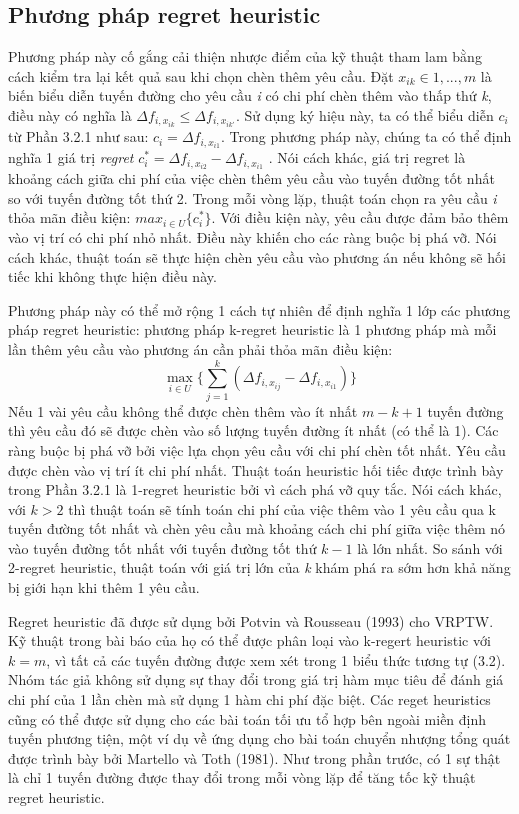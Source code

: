 \subsection{Phương pháp regret heuristic}
Phương pháp này cố gắng cải thiện nhược điểm của kỹ thuật tham lam bằng cách kiểm tra lại kết quả sau khi chọn chèn thêm yêu cầu. Đặt $x_{ik} \in {1, ..., m}$ là biến biểu diễn tuyến đường cho yêu cầu \textit{i} có chi phí chèn thêm vào thấp thứ \textit{k}, điều này có nghĩa là $\Delta f_{i, x_{ik}} \leqslant \Delta f_{i, x_{ik'}}$. Sử dụng ký hiệu này, ta có thể biểu diễn $c_i$ từ Phần 3.2.1 như sau: $c_i = \Delta f_{i, x_{i1}}$. Trong phương pháp này, chúng ta có thể định nghĩa 1 giá trị \textit{regret} $c_i^* = \Delta f_{i, x_{i2}} - \Delta f_{i, x_{i1}}$ . Nói cách khác, giá trị regret là khoảng cách giữa chi phí của việc chèn thêm yêu cầu vào tuyến đường tốt nhất so với tuyến đường tốt thứ 2. Trong mỗi vòng lặp, thuật toán chọn ra yêu cầu \textit{i} thỏa mãn điều kiện: $max_{i \in U} \{c_i^*\}$. Với điều kiện này, yêu cầu được đảm bảo thêm vào vị trí có chi phí nhỏ nhất. Điều này khiến cho các ràng buộc bị phá vỡ. Nói cách khác, thuật toán sẽ thực hiện chèn yêu cầu vào phương án nếu không sẽ hối tiếc khi không thực hiện điều này.

Phương pháp này có thể mở rộng 1 cách tự nhiên để định nghĩa 1 lớp các phương pháp regret heuristic: phương pháp k-regret heuristic là 1 phương pháp mà mỗi lần thêm yêu cầu vào phương án cần phải thỏa mãn điều kiện:
\begin{equation}
    \max\limits_{i \in U} \{ \sum_{j=1}^k (\Delta f_{i, x_{ij}} - \Delta f_{i, x_{i1}}) \}
\end{equation}
Nếu 1 vài yêu cầu không thể được chèn thêm vào ít nhất $m-k+1$ tuyến đường thì yêu cầu đó sẽ được chèn vào số lượng tuyến đường ít nhất (có thể là 1). Các ràng buộc bị phá vỡ bởi việc lựa chọn yêu cầu với chi phí chèn tốt nhất. Yêu cầu được chèn vào vị trí ít chi phí nhất. Thuật toán heuristic hối tiếc được trình bày trong Phần 3.2.1 là 1-regret heuristic bởi vì cách phá vỡ quy tắc. Nói cách khác, với $k>2$ thì thuật toán sẽ tính toán chi phí của việc thêm vào 1 yêu cầu qua k tuyến đường tốt nhất và chèn yêu cầu mà khoảng cách chi phí giữa việc thêm nó vào tuyến đường tốt nhất với tuyến đường tốt thứ $k-1$ là lớn nhất. So sánh với 2-regret heuristic, thuật toán với giá trị lớn của \textit{k} khám phá ra sớm hơn khả năng bị giới hạn khi thêm 1 yêu cầu.

Regret heuristic đã được sử dụng bởi Potvin và Rousseau (1993) cho VRPTW. Kỹ thuật trong bài báo của họ có thể được phân loại vào k-regert heuristic với $k=m$, vì tất cả các tuyến đường được xem xét trong 1 biểu thức tương tự (3.2). Nhóm tác giả không sử dụng sự thay đổi trong giá trị hàm mục tiêu để đánh giá chi phí của 1 lần chèn mà sử dụng 1 hàm chi phí đặc biệt. Các reget heuristics cũng có thể được sử dụng cho các bài toán tối ưu tổ hợp bên ngoài miền định tuyến phương tiện, một ví dụ về ứng dụng cho bài toán chuyển nhượng tổng quát được trình bày bởi Martello và Toth (1981). Như trong phần trước, có 1 sự thật là chỉ 1 tuyến đường được thay đổi trong mỗi vòng lặp để tăng tốc kỹ thuật regret heuristic.